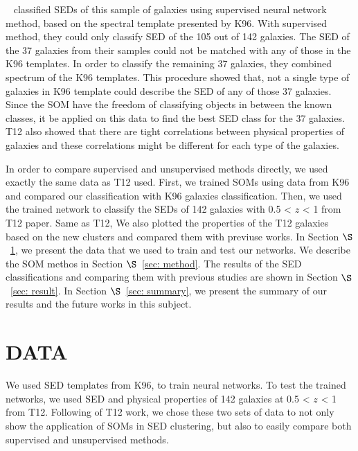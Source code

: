 \documentclass[useAMS,usenatbib]{mn2e}
\begin{document}
~\citet[][hereafter T12]{Hossein12} classified SEDs of this sample of galaxies using supervised neural network method, based on the spectral template presented by K96.
With supervised method, they could only classify SED of the 105 out of 142 galaxies.
The SED of the 37 galaxies from their samples could not be matched with any of those in the K96 templates. 
In order to classify the remaining 37 galaxies, they combined spectrum of the K96 templates.
This procedure showed that, not a single type of galaxies in K96 template could describe the SED of any of those 37 galaxies.
Since the SOM have the freedom of classifying objects in between the known classes, it be applied on this data to find the best SED class for the 37 galaxies.
T12 also showed that there are tight correlations between physical properties of galaxies and these correlations might be different for each type of the galaxies.

In order to compare supervised and unsupervised methods directly, we used exactly the same data as T12 used.  
First, we trained SOMs using data from K96 and compared our classification with K96 galaxies classification.
Then, we used the trained network to classify the SEDs of 142 galaxies with 0.5 < $z$ < 1 from T12 paper.
Same as T12, We also plotted the properties of the T12 galaxies based on the new clusters and compared them with previuse works.
In Section $\S$~\ref{sec: data}, we present the data that we used to train and test our networks. We describe the SOM methos in Section $\S$~\ref{sec: method}. The results of the SED classifications and comparing them with previous studies are shown in Section $\S$~\ref{sec: result}. In Section $\S$~\ref{sec: summary}, we present the summary of our results and the future works in this subject.


\section{DATA}
\label{sec: data}
We used SED templates from K96, to train neural networks.
To test the trained networks, we used SED and physical properties of 142 galaxies at 0.5 < $z$ < 1 from T12.
Following of T12 work, we chose these two sets of data to not only show the application of SOMs in SED clustering, but also to easily compare both supervised and unsupervised methods.
\end{document}

